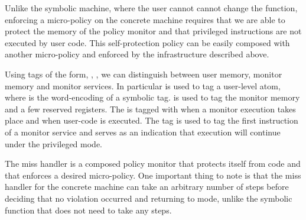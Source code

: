 Unlike the symbolic machine, where the user cannot cannot change the
\TRANSFER function, enforcing a micro-policy on the concrete machine requires
that we are able to protect the memory of the policy monitor and that privileged
instructions are not executed by user code. This self-protection policy can be
easily composed with another micro-policy and enforced by the infrastructure
described above.

Using tags of the form, , , \MONITOR we can
distinguish between user memory, monitor memory and monitor services.
In particular  is used to tag a user-level atom, where  is
the word-encoding of a symbolic tag. \MONITOR is used to tag the monitor memory
and a few reserved registers. The \pc is tagged with \MONITOR when a monitor
execution takes place and  when user-code is executed. The tag
 is used to tag the first instruction of a monitor service and
serves as an indication that execution will continue under the privileged
\MONITOR mode.

The miss handler is a composed policy monitor that protects itself from
\USERname code and that enforces a desired micro-policy.
One important thing to note is that the miss handler for the concrete machine
can take an arbitrary number of steps before deciding that no violation occurred
and returning to \USERname mode, unlike the symbolic \TRANSFER function that
does not need to take any steps.

